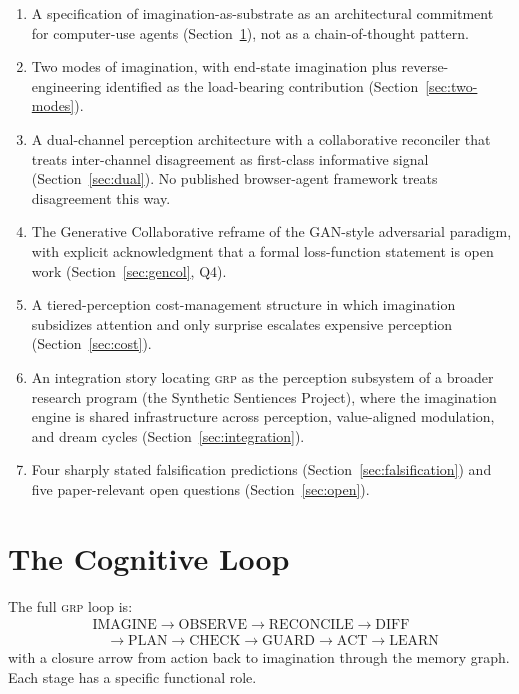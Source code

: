 \documentclass[12pt]{article}
\theoremstyle{definition}
\theoremstyle{remark}
\newcommand{\grp}{\textsc{grp}}
\begin{document}
\begin{enumerate}[leftmargin=*]
\item A specification of imagination-as-substrate as an architectural
  commitment for computer-use agents (Section~\ref{sec:loop}), not as
  a chain-of-thought pattern.
\item Two modes of imagination, with end-state imagination plus
  reverse-engineering identified as the load-bearing
  contribution (Section~\ref{sec:two-modes}).
\item A dual-channel perception architecture with a collaborative
  reconciler that treats inter-channel disagreement as first-class
  informative signal (Section~\ref{sec:dual}). No published browser-agent
  framework treats disagreement this way.
\item The Generative Collaborative reframe of the GAN-style adversarial
  paradigm, with explicit acknowledgment that a formal loss-function
  statement is open work (Section~\ref{sec:gencol}, Q4).
\item A tiered-perception cost-management structure in which imagination
  subsidizes attention and only surprise escalates expensive
  perception (Section~\ref{sec:cost}).
\item An integration story locating \grp{} as the perception subsystem of
  a broader research program (the Synthetic Sentiences Project), where
  the imagination engine is shared infrastructure across perception,
  value-aligned modulation, and dream cycles
  (Section~\ref{sec:integration}).
\item Four sharply stated falsification predictions
  (Section~\ref{sec:falsification}) and five paper-relevant open
  questions (Section~\ref{sec:open}).
\end{enumerate}

\section{The Cognitive Loop}
\label{sec:loop}

The full \grp{} loop is:
\begin{equation*}
\begin{aligned}
&\text{IMAGINE} \to \text{OBSERVE} \to \text{RECONCILE} \to \text{DIFF} \\
&\quad \to \text{PLAN} \to \text{CHECK} \to \text{GUARD} \to \text{ACT} \to \text{LEARN}
\end{aligned}
\end{equation*}
with a closure arrow from action back to imagination through the memory
graph. Each stage has a specific functional role.
\end{document}

